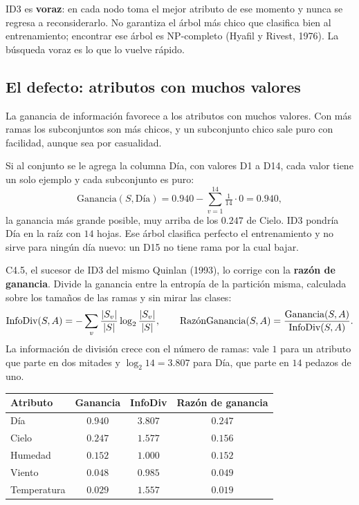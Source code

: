 \documentclass[11pt,letterpaper]{article}
\begin{document}
\begin{ojo}
    ID3 es \textbf{voraz}: en cada nodo toma el mejor atributo de ese
    momento y nunca se regresa a reconsiderarlo. No garantiza el árbol
    más chico que clasifica bien al entrenamiento; encontrar ese árbol
    es NP-completo (Hyafil y Rivest, 1976). La búsqueda voraz es lo
    que lo vuelve rápido.
\end{ojo}


\subsection*{El defecto: atributos con muchos valores}

La ganancia de información favorece a los atributos con muchos
valores. Con más ramas los subconjuntos son más chicos, y un
subconjunto chico sale puro con facilidad, aunque sea por casualidad.

\begin{ejemplo}
    Si al conjunto se le agrega la columna Día, con valores D1 a D14,
    cada valor tiene un solo ejemplo y cada subconjunto es puro:
    \[
        \text{Ganancia}(S, \text{Día})
            = 0.940 - \sum_{v=1}^{14} \tfrac{1}{14} \cdot 0
            = 0.940 ,
    \]
    la ganancia más grande posible, muy arriba de los $0.247$ de
    Cielo. ID3 pondría Día en la raíz con $14$ hojas. Ese árbol
    clasifica perfecto el entrenamiento y no sirve para ningún día
    nuevo: un D15 no tiene rama por la cual bajar.
\end{ejemplo}

C4.5, el sucesor de ID3 del mismo Quinlan (1993), lo corrige con la
\textbf{razón de ganancia}. Divide la ganancia entre la entropía de la
partición misma, calculada sobre los tamaños de las ramas y sin mirar
las clases:
\[
    \text{InfoDiv}(S, A) = -\sum_{v} \frac{\left\lvert S_v \right\rvert}{\left\lvert S \right\rvert}
                              \log_2 \frac{\left\lvert S_v \right\rvert}{\left\lvert S \right\rvert} ,
    \qquad
    \text{RazónGanancia}(S, A)
        = \frac{\text{Ganancia}(S, A)}{\text{InfoDiv}(S, A)} .
\]
La información de división crece con el número de ramas: vale $1$ para
un atributo que parte en dos mitades y $\log_2 14 = 3.807$ para Día,
que parte en $14$ pedazos de uno.

\begin{center}
\small
\begin{tabular}{lccc}
    \toprule
    \textbf{Atributo} & \textbf{Ganancia} & \textbf{InfoDiv}
        & \textbf{Razón de ganancia} \\
    \midrule
    Día         & $0.940$ & $3.807$ & $0.247$ \\
    Cielo       & $0.247$ & $1.577$ & $0.156$ \\
    Humedad     & $0.152$ & $1.000$ & $0.152$ \\
    Viento      & $0.048$ & $0.985$ & $0.049$ \\
    Temperatura & $0.029$ & $1.557$ & $0.019$ \\
    \bottomrule
\end{tabular}
\end{center}
\end{document}
